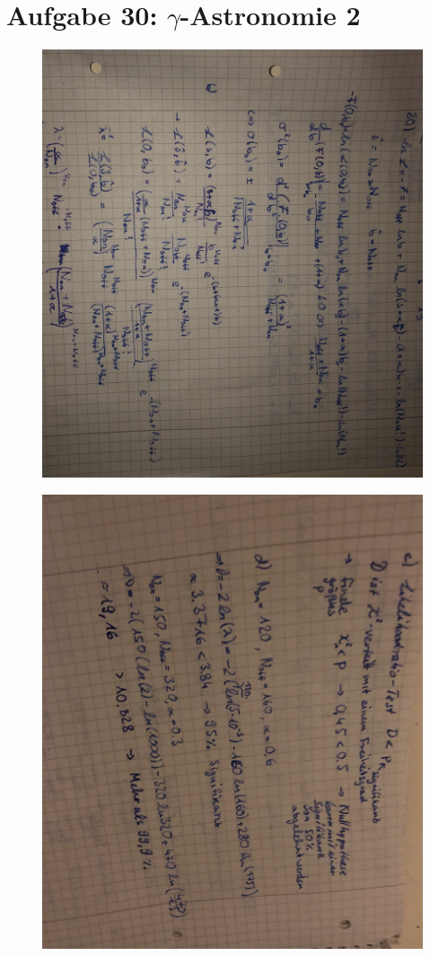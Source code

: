 \section*{Aufgabe 30: $\gamma$-Astronomie 2}
\label{sec:Aufgabe2}

\begin{figure}
\centering
\includegraphics[keepaspectratio, width=\textwidth]{content/images/2ab.jpeg}
\end{figure}
\begin{figure}
\centering
\includegraphics[keepaspectratio, width=\textwidth]{content/images/2cd.jpeg}
\end{figure}